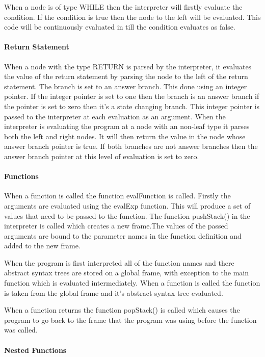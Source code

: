 \documentclass{article}
\begin{document}
	When a node is of type WHILE then the interpreter will firstly evaluate the condition. If the condition is true then the node to the left will be evaluated. This code will be continuously evaluated in till the condition evaluates as false.
	
	\paragraph{Return Statement} 
	
	When a node with the type RETURN is parsed by the interpreter, it evaluates the value of the return statement by parsing the node to the left of the return statement. The branch is set to an answer branch. This done using an integer pointer. If the integer pointer is set to one then the branch is an answer branch if the pointer is set to zero then it's a state changing branch. This integer pointer is passed to the interpreter at each evaluation as an argument. When the interpreter is evaluating the program at a node with an non-leaf type it parses both the left and right nodes. It will then return the value in the node whose answer branch pointer is true. If both branches are not answer branches then the answer branch pointer at this level of evaluation is set to zero.
	
	\paragraph{Functions}
	
	When a function is called the function evalFunction is called. Firstly the arguments are evaluated using the evalExp function. This will produce a set of values that need to be passed to the function. The function pushStack() in the interpreter is called which creates a new frame.The values of the passed arguments are bound to the parameter names in the function definition and added to the new frame.
	
	When the program is first interpreted all of the function names and there abstract syntax trees are stored on a global frame, with exception to the main function which is evaluated intermediately. When a function is called the function is taken from the global frame and it's abstract syntax tree evaluated.
	
	When a function returns the function popStack() is called which causes the program to go back to the frame that the program was using before the function was called.  
	
	\paragraph{Nested Functions} 
	
\end{document}
